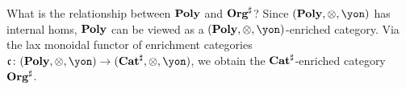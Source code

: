 \begin{remark}
    What is the relationship between $\mathbf{Poly}$ and $\mathbf{Org}^\sharp$? Since $(\poly, \otimes, \yon)$ has internal homs, $\mathbf{Poly}$ can be viewed as a $(\poly, \otimes, \yon)$-enriched category. Via the lax monoidal functor of enrichment categories $\cofree\colon (\poly, \otimes, \yon) \to (\smcat^\sharp, \otimes, \yon)$, we obtain the $\mathbf{Cat}^\sharp$-enriched category $\mathbf{Org}^\sharp$.
\end{remark}

